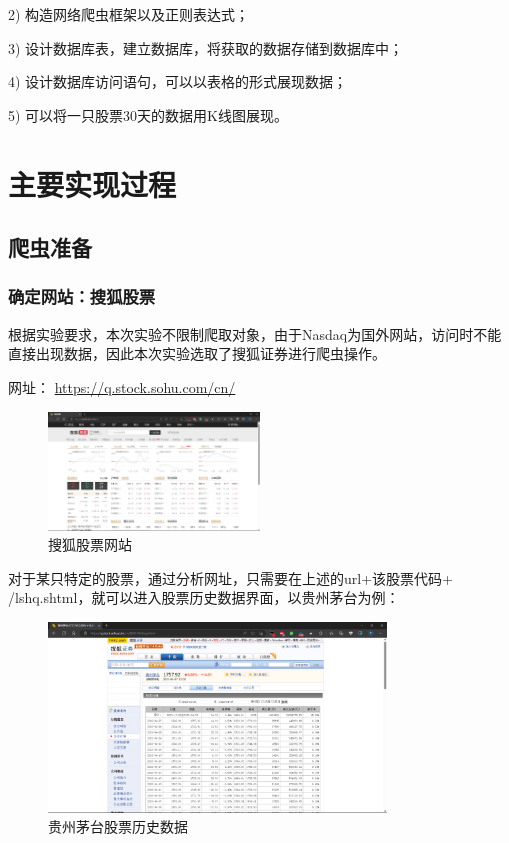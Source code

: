 \documentclass[UTF8,12pt]{article}
\begin{document}
2)	构造网络爬虫框架以及正则表达式；

3)	设计数据库表，建立数据库，将获取的数据存储到数据库中；

4)	设计数据库访问语句，可以以表格的形式展现数据；

5)	可以将一只股票30天的数据用K线图展现。

\section{主要实现过程}

\subsection{爬虫准备}

\subsubsection{确定网站：搜狐股票}
根据实验要求，本次实验不限制爬取对象，由于Nasdaq为国外网站，访问时不能直接出现数据，因此本次实验选取了搜狐证券进行爬虫操作。

网址：
\href{https://q.stock.sohu.com/cn/}{https://q.stock.sohu.com/cn/}

\begin{figure}[htbp]
    \centering
    \includegraphics[width=0.5\textwidth]{img/1.png}
    \caption{搜狐股票网站}
\end{figure}

\newpage

对于某只特定的股票，通过分析网址，只需要在上述的url+该股票代码+ /lshq.shtml，就可以进入股票历史数据界面，以贵州茅台为例：
\begin{figure}[htbp]
    \centering
    \includegraphics[width=0.8\textwidth]{img/2.png}
    \caption{贵州茅台股票历史数据}
\end{figure}
\end{document}
